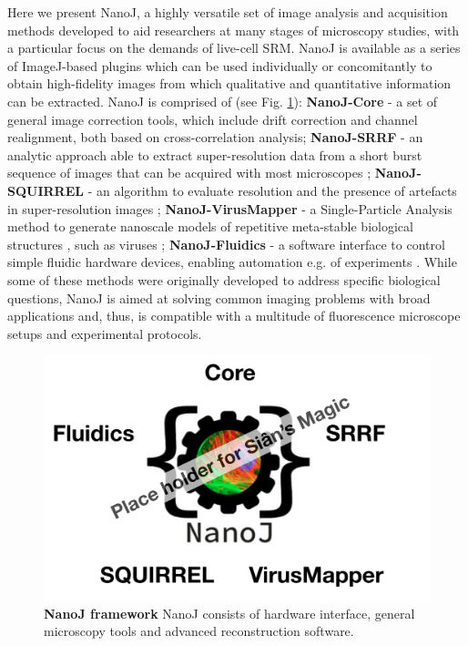   Here we present NanoJ, a highly versatile set of image analysis and acquisition methods developed to aid researchers at many stages of microscopy studies, with a particular focus on the demands of live-cell SRM. NanoJ is available as a series of ImageJ-based plugins which can be used individually or concomitantly to obtain high-fidelity images from which qualitative and quantitative information can be extracted. NanoJ is comprised of (see Fig. \ref{fig:GeneralDiagram}): \textbf{NanoJ-Core} - a set of general image correction tools, which include drift correction and channel realignment, both based on cross-correlation analysis; \textbf{NanoJ-SRRF} - an analytic approach able to extract super-resolution data from a short burst sequence of images that can be acquired with most microscopes \cite{gustafsson2016fast,culley2018srrf}; \textbf{NanoJ-SQUIRREL} - an algorithm to evaluate resolution and the presence of artefacts in super-resolution images \cite{culley2018quantitative}; \textbf{NanoJ-VirusMapper} - a Single-Particle Analysis method to generate nanoscale models of repetitive meta-stable biological structures \cite{gray2016virus,gray2017}, such as viruses \cite{gray2018nanoscale}; \textbf{NanoJ-Fluidics} - a software interface to control simple fluidic hardware devices, enabling automation e.g. of \multiplexing experiments \cite{almada2018automating}. While some of these methods were originally developed to address specific biological questions, NanoJ is aimed at solving common imaging problems with broad applications and, thus, is compatible with a multitude of fluorescence microscope setups and experimental protocols. 
 
  
\begin{figure}[!t]
    \centering
    \includegraphics[width=\linewidth]{Figures/Figure1_v2.png}
    \caption{\textbf{NanoJ framework} NanoJ consists of hardware interface, general microscopy tools and advanced reconstruction software.}
    \label{fig:GeneralDiagram}
\end{figure}
  
